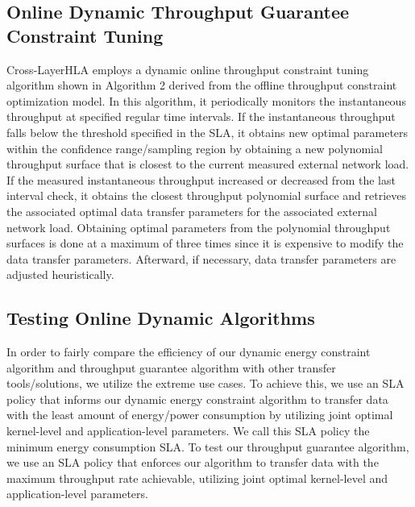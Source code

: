 \documentclass[conference]{IEEEtran}
\begin{document}
\subsection{Online Dynamic Throughput Guarantee Constraint Tuning }
Cross-LayerHLA employs a dynamic online throughput constraint tuning algorithm shown in Algorithm 2 derived from the offline throughput constraint optimization model. In this algorithm, it periodically monitors the instantaneous throughput at specified regular time intervals. If the instantaneous throughput falls below the threshold specified in the SLA, it obtains new optimal parameters within the confidence range/sampling region by obtaining a new polynomial throughput surface that is closest to the current measured external network load. If the measured instantaneous throughput increased or decreased from the last interval check, it obtains the closest throughput polynomial surface and retrieves the associated optimal data transfer parameters for the associated external network load. Obtaining optimal parameters from the polynomial throughput surfaces is done at a maximum of three times since it is expensive to modify the data transfer parameters. Afterward, if necessary, data transfer parameters are adjusted heuristically.


\subsection{Testing Online Dynamic Algorithms }
In order to fairly compare the efficiency of our dynamic energy constraint algorithm and throughput guarantee algorithm with other transfer tools/solutions, we utilize the extreme use cases. To achieve this, we use an SLA policy that informs our dynamic energy constraint algorithm to transfer data with the least amount of energy/power consumption by utilizing joint optimal kernel-level and application-level parameters. We call this SLA policy the minimum energy consumption SLA. To test our throughput guarantee algorithm, we use an SLA policy that enforces our algorithm to transfer data with the maximum throughput rate achievable, utilizing joint optimal kernel-level and application-level parameters.
\end{document}
